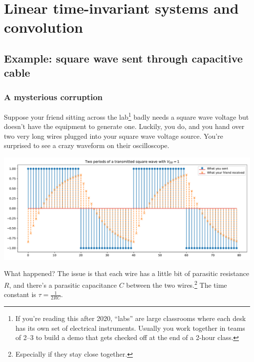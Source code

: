 \chapter{Linear time-invariant systems and convolution}

\section{Example: square wave sent through capacitive cable}
\subsection{A mysterious corruption}
Suppose your friend sitting across the lab\footnote{If you're reading this after 2020, ``labs'' are large classrooms where each desk has its own set of electrical instruments. Usually you work together in teams of 2--3 to build a demo that gets checked off at the end of a 2-hour class.}
badly needs a square wave voltage but doesn't have the equipment to generate one.
Luckily, you do, and you hand over two very long wires plugged into your square wave voltage source.
You're surprised to see a crazy waveform on their oscilloscope.
\begin{center}
  \includegraphics[width=\linewidth]{27-figs/sqwave-lowpassed}
\end{center}
What happened?
The issue is that each wire has a little bit of parasitic resistance \(R\), and there's a parasitic capacitance \(C\) between the two wires.\footnote{Especially if they stay close together.}
The time constant is \(\tau = \frac{1}{2RC}\).

